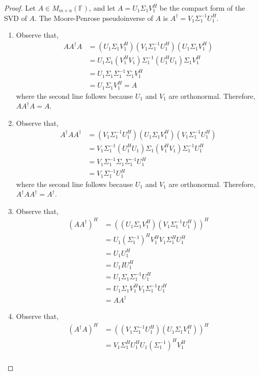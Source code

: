 \documentclass[letterpaper,12pt]{article}
\theoremstyle{definition}
\begin{document}
\begin{proof}
	Let $A \in M_{m \times n} (\mathbb{F})$, and let $A = U_1 \Sigma_1 V_1^H$ be the compact form of the SVD of $A$. The Moore-Penrose pseudoinverse of $A$ is $A^{\dagger} = V_1 \Sigma^{-1}_1 U^H_1$.
	\begin{enumerate}
	\item Observe that,
	\begin{align*}
	A A^{\dagger} A  &= (U_1 \Sigma_1 V_1^H)(V_1 \Sigma^{-1}_1 U^H_1) (U_1 \Sigma_1 V_1^H) \\
	&=  U_1 \Sigma_1 (V_1^HV_1) \Sigma^{-1}_1 (U^H_1 U_1) \Sigma_1 V_1^H \\
	&= U_1 \Sigma_1  \Sigma^{-1}_1 \Sigma_1 V_1^H  \\
	&= U_1 \Sigma_1 V_1^H = A
	\end{align*}
	where the second line follows because $U_1$ and $V_1$ are orthonormal. Therefore, $ A A^{\dagger} A = A$.
	\item Observe that,
	\begin{align*}
	A^{\dagger} A A^{\dagger} &= (V_1 \Sigma^{-1}_1 U^H_1)(U_1 \Sigma_1 V_1^H )(V_1 \Sigma^{-1}_1 U^H_1) \\
	&= V_1 \Sigma^{-1}_1 (U^H_1U_1) \Sigma_1 (V_1^H V_1) \Sigma^{-1}_1 U^H_1 \\
	&= V_1 \Sigma^{-1}_1 \Sigma_1 \Sigma^{-1}_1 U^H_1 \\
	&= V_1 \Sigma^{-1}_1 U^H_1 
	\end{align*}
		where the second line follows because $U_1$ and $V_1$ are orthonormal. Therefore, $ A^{\dagger} A A^{\dagger} = A^{\dagger}$.
	\item Observe that,
	\begin{align*}
	(AA^{\dagger})^H &= ((U_1 \Sigma_1 V_1^H)(V_1 \Sigma^{-1}_1 U^H_1))^H \\
	&= U_1 (\Sigma_1^{-1})^H V_1^H V_1 \Sigma_1^HU_1^H \\
	&= U_1 U_1^H \\
	&= U_1 I U_1^H \\
	&= U_1 \Sigma_1 \Sigma_1^{-1} U_1^H \\
	&= U_1 \Sigma_1 V_1^H V_1 \Sigma_1^{-1} U_1^H \\
	&= A A^{\dagger}
	\end{align*}
	\item Observe that,
	\begin{align*}
	(A^{\dagger} A)^H &= ((V_1 \Sigma^{-1}_1 U^H_1)(U_1 \Sigma_1 V_1^H))^H \\
	&= V_1 \Sigma_1^H U_1^H U_1 (\Sigma_1^{-1})^H V_1^H \\

\end{align*}
\end{enumerate}
\end{proof}
\end{document}

